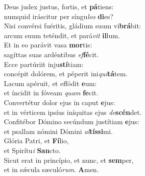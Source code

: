 \evenverse Deus judex justus, fortis, et \textbf{pá}tiens:~\*\\
\evenverse numquid iráscitur per síngu\textit{los} \textbf{di}es?\\
\oddverse Nisi convérsi fuéritis, gládium suum vi\textbf{brá}bit:~\*\\
\oddverse arcum suum teténdit, et pará\textit{vit} \textbf{il}lum.\\
\evenverse Et in eo parávit vasa \textbf{mor}tis:~\*\\
\evenverse sagíttas suas ardéntibus \textit{ef}\textbf{fé}cit.\\
\oddverse Ecce partúriit inju\textbf{stí}tiam:~\*\\
\oddverse concépit dolórem, et péperit ini\textit{qui}\textbf{tá}tem.\\
\evenverse Lacum apéruit, et effódit \textbf{e}um:~\*\\
\evenverse et íncidit in fóveam \textit{quam} \textbf{fe}cit.\\
\oddverse Convertétur dolor ejus in caput \textbf{e}jus:~\*\\
\oddverse et in vérticem ipsíus iníquitas ejus \textit{de}\textbf{scén}det.\\
\evenverse Confitébor Dómino secúndum justítiam \textbf{e}jus:~\*\\
\evenverse et psallam nómini Dómini \textit{al}\textbf{tís}\textbf{si}mi.\\
\oddverse Glória Patri, et \textbf{Fí}lio,~\*\\
\oddverse et Spirítu\textit{i} \textbf{San}cto.\\
\evenverse Sicut erat in princípio, et nunc, et \textbf{sem}per,~\*\\
\evenverse et in sǽcula sæculó\textit{rum}. \textbf{A}men.\\
